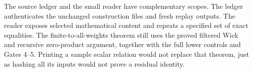 The source ledger and the small reader have complementary scopes.
The ledger authenticates the unchanged construction files and
fresh replay outputs.  The reader exposes selected mathematical
content and repeats a specified set of exact equalities.  The
finite-to-all-weights theorem still uses the proved filtered Wick
and recursive zero-product argument, together with the full lower
controls and Gates 4--5.  Printing a sample scalar relation would
not replace that theorem, just as hashing all its inputs would
not prove a residual identity.

